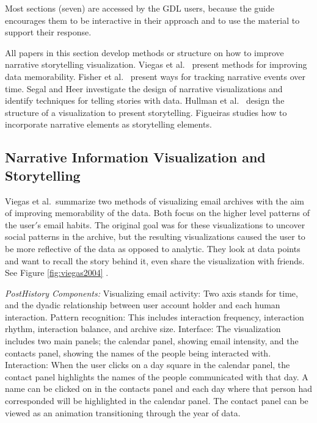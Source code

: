 \documentclass{egpubl}
\begin{document}
Most sections (seven) are accessed by the GDL users, because the guide encourages them to be interactive in their approach and to use the material to support their response. 

All papers in this section develop methods or structure on how to improve narrative storytelling visualization. Viegas et al.\ \cite{viegas2004} present methods for improving data memorability. Fisher et al.\ \cite{fisher} present ways for tracking narrative events over time. Segal and Heer \cite{segal} investigate the design of narrative visualizations and identify techniques for telling stories with data. Hullman et al.\ \cite{hullman,hullman2013,hullman2013deeper}
design the structure of a visualization to present storytelling.  Figueiras \cite{figueiras,figueiras2014tell} studies how to incorporate narrative elements as storytelling elements.

\subsection{Narrative Information Visualization and Storytelling}

Viegas et al.\ summarize two methods of visualizing email archives with the aim of improving memorability of the data. Both focus on the higher level patterns of the user$'$s email habits. The original goal was for these visualizations to uncover social patterns in the archive, but the resulting visualizations caused the user to be more reflective of the data as opposed to analytic. They look at data points and want to recall the story behind it, even share the visualization with friends. See Figure \ref{fig:viegas2004} \cite{viegas2004}.


\textit{PostHistory Components:}
Visualizing email activity: Two axis stands for time, and the dyadic relationship between user account holder and each human interaction.
Pattern recognition: This includes interaction frequency, interaction rhythm, interaction balance, and archive size.
Interface: The visualization includes two main panels; the calendar panel, showing email intensity, and the contacts panel, showing the names of the people being interacted with. 
Interaction: When the user clicks on a day square in the calendar panel, the contact panel highlights the names of the people communicated with that day. A name can be clicked on in the contacts panel and each day where that person had corresponded will be highlighted in the calendar panel. The contact panel can be viewed as an animation transitioning through the year of data.
\end{document}
